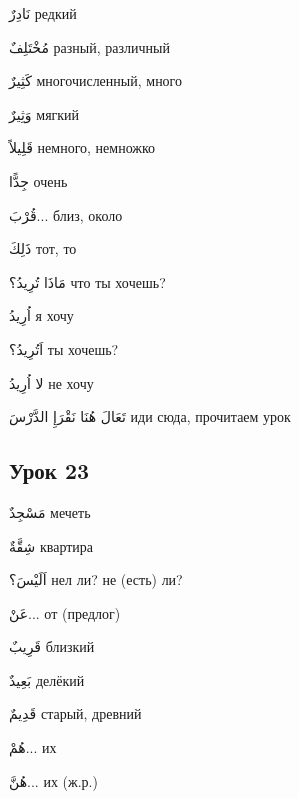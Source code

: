 \documentclass[a5paper]{article}
\newcommand\textstyleDropCaps[1]{#1}
\newcommand\textstyleCaptioncharacters[1]{#1}
\begin{document}
\textstyleCaptioncharacters{نَادِرٌ }\textstyleDropCaps{редкий‎}

\textstyleCaptioncharacters{مُخْتَلِفٌ }\textstyleDropCaps{разный, различ­ный‎}

\textstyleCaptioncharacters{كَثِيرٌ }\textstyleDropCaps{многочисленный, много‎}

\textstyleCaptioncharacters{وَثِيرٌ }\textstyleDropCaps{мягкий‎}

\textstyleCaptioncharacters{قَلِيلاً }\textstyleDropCaps{немного, немножко‎}

\textstyleCaptioncharacters{جِدًّا }\textstyleDropCaps{очень‎}

\textstyleCaptioncharacters{قُرْبَ...ِ }\textstyleDropCaps{близ, около‎}

\textstyleCaptioncharacters{ذَلِكَ }\textstyleDropCaps{тот, то‎}

\textstyleCaptioncharacters{مَاذَا تُرِيدُ؟ }\textstyleDropCaps{что ты хо­чешь?‎}

\textstyleCaptioncharacters{اُرِيدُ }\textstyleDropCaps{я хочу‎}

\textstyleCaptioncharacters{اَتُرِيدُ؟ }\textstyleDropCaps{ты хочешь?‎}

\textstyleCaptioncharacters{لا اُرِيدُ }\textstyleDropCaps{не хочу‎}

\textstyleCaptioncharacters{تَعَالَ هُنَا نَقْرَإِ الدَّرْسَ }\textstyleDropCaps{иди сюда, прочитаем урок‎}

\subsection[Урок 23‎]{\textstyleDropCaps{Урок 23‎}}
\textstyleCaptioncharacters{مَسْجِدٌ }\textstyleDropCaps{мечеть‎}

\textstyleCaptioncharacters{شِقَّةٌ }\textstyleDropCaps{квартира‎}

\textstyleCaptioncharacters{اَلَيْسَ؟ }\textstyleDropCaps{нел ли? не (есть) ли?‎}

\textstyleCaptioncharacters{عَنْ...ِ }\textstyleDropCaps{от (предлог)‎}

\textstyleCaptioncharacters{قَرِيبٌ }\textstyleDropCaps{близкий‎}

\textstyleCaptioncharacters{بَعِيدٌ }\textstyleDropCaps{делёкий‎}

\textstyleCaptioncharacters{قَدِيمٌ }\textstyleDropCaps{старый, древний‎}

\textstyleCaptioncharacters{هُمْ... }\textstyleDropCaps{их‎}

\textstyleCaptioncharacters{هُنَّ... }\textstyleDropCaps{их (ж.р.)‎}
\end{document}
